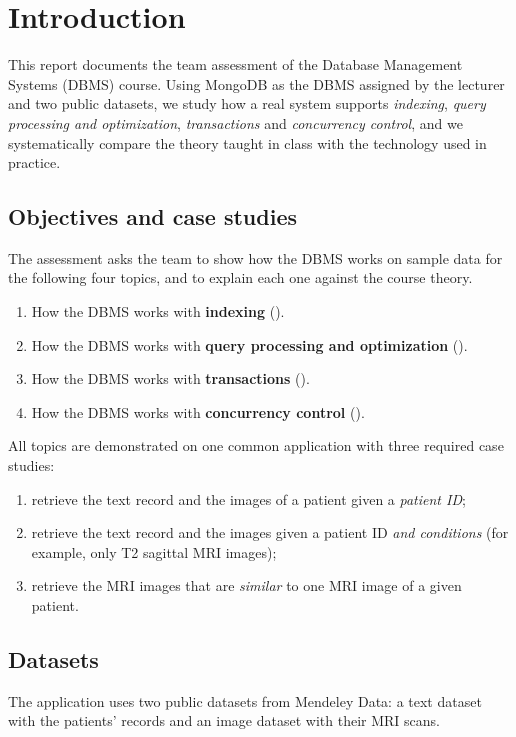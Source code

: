 \section{Introduction}
\label{sec:intro}

This report documents the team assessment of the Database Management Systems (DBMS) course.
Using MongoDB as the DBMS assigned by the lecturer and two public datasets, we study how a
real system supports \emph{indexing}, \emph{query processing and optimization},
\emph{transactions} and \emph{concurrency control}, and we systematically compare the theory
taught in class with the technology used in practice.

\subsection{Objectives and case studies}
\label{sec:objectives}

The assessment asks the team to show how the DBMS works on sample data for the following four
topics, and to explain each one against the course theory.
\begin{enumerate}
  \item How the DBMS works with \textbf{indexing} ().
  \item How the DBMS works with \textbf{query processing and optimization}
        ().
  \item How the DBMS works with \textbf{transactions} ().
  \item How the DBMS works with \textbf{concurrency control} ().
\end{enumerate}
All topics are demonstrated on one common application with three required case studies:
\begin{enumerate}[label=\textbf{C\arabic*.}]
  \item retrieve the text record and the images of a patient given a \emph{patient ID};
  \item retrieve the text record and the images given a patient ID \emph{and conditions}
        (for example, only T2 sagittal MRI images);
  \item retrieve the MRI images that are \emph{similar} to one MRI image of a given patient.
\end{enumerate}

\subsection{Datasets}
\label{sec:datasets}
The application uses two public datasets from Mendeley Data: a text dataset with the patients'
records and an image dataset with their MRI scans. 

